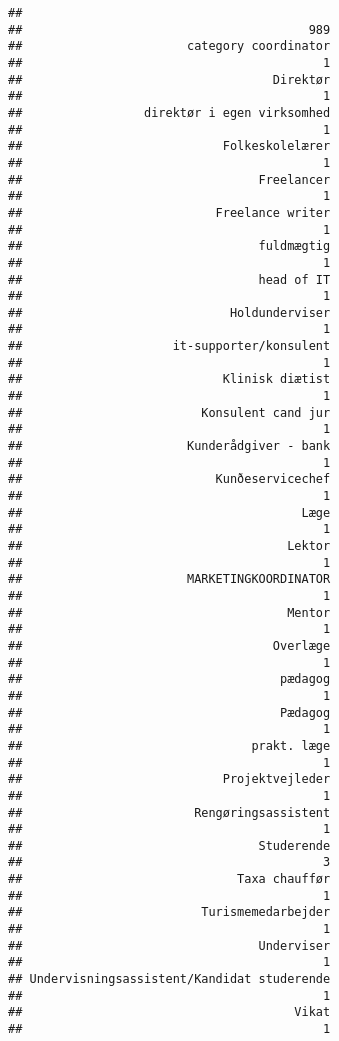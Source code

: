 \documentclass[]{article}
\begin{document}
\begin{verbatim}
##                                            
##                                        989 
##                       category coordinator 
##                                          1 
##                                   Direktør 
##                                          1 
##                 direktør i egen virksomhed 
##                                          1 
##                            Folkeskolelærer 
##                                          1 
##                                 Freelancer 
##                                          1 
##                           Freelance writer 
##                                          1 
##                                 fuldmægtig 
##                                          1 
##                                 head of IT 
##                                          1 
##                             Holdunderviser 
##                                          1 
##                     it-supporter/konsulent 
##                                          1 
##                            Klinisk diætist 
##                                          1 
##                         Konsulent cand jur 
##                                          1 
##                       Kunderådgiver - bank 
##                                          1 
##                           Kunðeservicechef 
##                                          1 
##                                       Læge 
##                                          1 
##                                     Lektor 
##                                          1 
##                       MARKETINGKOORDINATOR 
##                                          1 
##                                     Mentor 
##                                          1 
##                                   Overlæge 
##                                          1 
##                                    pædagog 
##                                          1 
##                                    Pædagog 
##                                          1 
##                                prakt. læge 
##                                          1 
##                            Projektvejleder 
##                                          1 
##                        Rengøringsassistent 
##                                          1 
##                                 Studerende 
##                                          3 
##                              Taxa chauffør 
##                                          1 
##                         Turismemedarbejder 
##                                          1 
##                                 Underviser 
##                                          1 
## Undervisningsassistent/Kandidat studerende 
##                                          1 
##                                      Vikat 
##                                          1
\end{verbatim}
\end{document}
